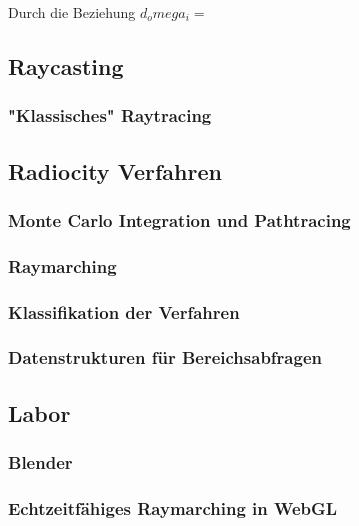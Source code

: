 Durch die Beziehung $d_omega_i = $

\subsection{Raycasting}
\subsubsection{"Klassisches" Raytracing}
\subsection{Radiocity Verfahren}
\subsubsection{Monte Carlo Integration und Pathtracing}
\subsubsection{Raymarching}
\subsubsection{Klassifikation der Verfahren}

\subsubsection{Datenstrukturen für Bereichsabfragen}


\subsection{Labor}
\subsubsection{Blender}
\subsubsection{Echtzeitfähiges Raymarching in WebGL}

